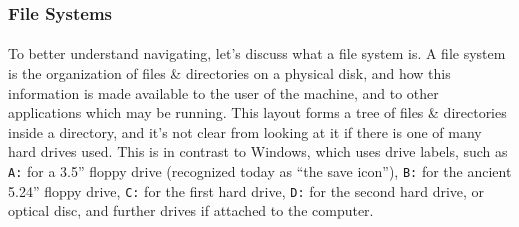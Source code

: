 \documentclass[letter,11pt]{article}
\begin{document}
\FloatBarrier
\subsubsection{File Systems}
\paragraph{}To better understand navigating, let's discuss what a file system is. A file system is the organization of files \& directories on a physical disk, and how this information is made available to the user of the machine, and to other applications which may be running. This layout forms a tree of files \& directories inside a directory, and it's not clear from looking at it if there is one of many hard drives used. This is in contrast to Windows, which uses drive labels, such as \texttt{A:} for a 3.5'' floppy drive (recognized today as ``the save icon''), \texttt{B:} for the ancient 5.24'' floppy drive, \texttt{C:} for the first hard drive, \texttt{D:} for the second hard drive, or optical disc, and further drives if attached to the computer.
\end{document}
